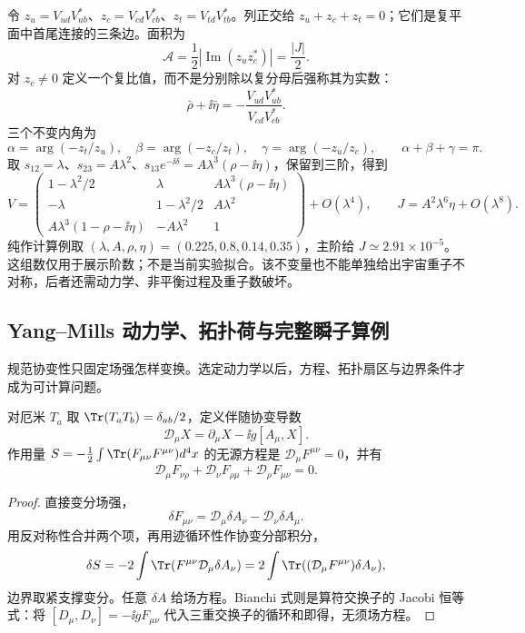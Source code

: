 \begin{workedexample}[酉三角形与层次展开]
令 $z_u=V_{ud}V_{ub}^*$、$z_c=V_{cd}V_{cb}^*$、$z_t=V_{td}V_{tb}^*$。列正交给 $z_u+z_c+z_t=0$；它们是复平面中首尾连接的三条边。面积为
\[
 \mathcal A=\frac12|\operatorname{Im}(z_uz_c^*)|=\frac{|J|}{2}.
\]
对 $z_c\ne0$ 定义一个复比值，而不是分别除以复分母后强称其为实数：
\begin{equation}
 \bar\rho+\ii\bar\eta=-\frac{V_{ud}V_{ub}^*}{V_{cd}V_{cb}^*}.
 \label{eq:rho-eta-bar}
\end{equation}
三个不变内角为
\begin{equation}
 \alpha=\arg(-z_t/z_u),\quad\beta=\arg(-z_c/z_t),\quad\gamma=\arg(-z_u/z_c),
 \qquad \alpha+\beta+\gamma=\pi.
 \label{eq:unitarity-angles}
\end{equation}
取 $s_{12}=\lambda$、$s_{23}=A\lambda^2$、$s_{13}e^{-\ii\delta}=A\lambda^3(\rho-\ii\eta)$，保留到三阶，得到
\[
 V=\begin{pmatrix}
 1-\lambda^2/2&\lambda&A\lambda^3(\rho-\ii\eta)\\
 -\lambda&1-\lambda^2/2&A\lambda^2\\
 A\lambda^3(1-\rho-\ii\eta)&-A\lambda^2&1
 \end{pmatrix}+O(\lambda^4),\qquad
 J=A^2\lambda^6\eta+O(\lambda^8).
\]
纯作计算例取 $(\lambda,A,\rho,\eta)=(0.225,0.8,0.14,0.35)$，主阶给 $J\simeq2.91\times10^{-5}$。这组数仅用于展示阶数；不是当前实验拟合。该不变量也不能单独给出宇宙重子不对称，后者还需动力学、非平衡过程及重子数破坏。
\end{workedexample}

\subsection{Yang--Mills 动力学、拓扑荷与完整瞬子算例}

规范协变性只固定场强怎样变换。选定动力学以后，方程、拓扑扇区与边界条件才成为可计算问题。

\begin{proposition}
对厄米 $T_a$ 取 $\Tr(T_aT_b)=\delta_{ab}/2$，定义伴随协变导数
\[
 \mathcal D_\mu X=\partial_\mu X-\ii g[A_\mu,X].
\]
作用量 $S=-\tfrac12\int\Tr(F_{\mu\nu}F^{\mu\nu})d^4x$ 的无源方程是 $\mathcal D_\mu F^{\mu\nu}=0$，并有
\[
 \mathcal D_\mu F_{\nu\rho}+\mathcal D_\nu F_{\rho\mu}+\mathcal D_\rho F_{\mu\nu}=0.
\]
\end{proposition}
\begin{proof}
直接变分场强，
\[
 \delta F_{\mu\nu}=\mathcal D_\mu\delta A_\nu-\mathcal D_\nu\delta A_\mu.
\]
用反对称性合并两个项，再用迹循环性作协变分部积分，
\[
 \delta S=-2\int\Tr(F^{\mu\nu}\mathcal D_\mu\delta A_\nu)
 =2\int\Tr((\mathcal D_\mu F^{\mu\nu})\delta A_\nu),
\]
边界取紧支撑变分。任意 $\delta A$ 给场方程。Bianchi 式则是算符交换子的 Jacobi 恒等式：将 $[D_\mu,D_\nu]=-\ii gF_{\mu\nu}$ 代入三重交换子的循环和即得，无须场方程。
\end{proof}

